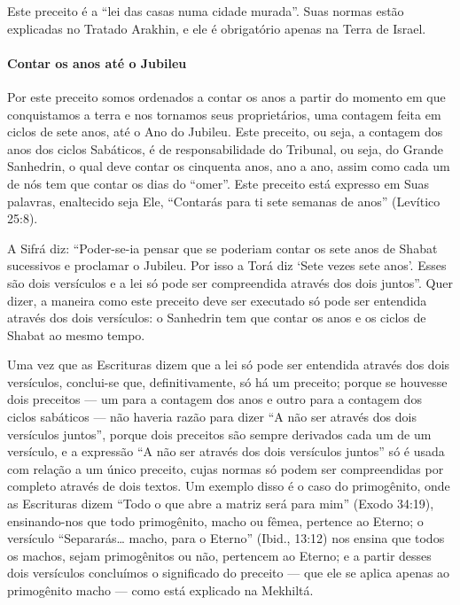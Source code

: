 Este preceito é a ``lei das casas numa cidade murada''. Suas normas
estão explicadas no Tratado Arakhin, e ele é obrigatório apenas na Terra
de Israel.

\paragraph{Contar os anos até o Jubileu}

Por este preceito somos ordenados a contar os anos a partir do momento
em que conquistamos a terra e nos tornamos seus proprietários, uma
contagem feita em ciclos de sete anos, até o Ano do Jubileu. Este
preceito, ou seja, a contagem dos anos dos ciclos Sabáticos, é de
responsabilidade do Tribunal, ou seja, do Grande Sanhedrin, o qual deve
contar os cinquenta anos, ano a ano, assim como cada um de nós tem que
contar os dias do ``omer''. Este preceito está expresso em Suas
palavras, enaltecido seja Ele, ``Contarás para ti sete semanas de anos''
(Levítico 25:8).

A Sifrá diz: ``Poder-se-ia pensar que se poderiam contar os sete anos de
Shabat sucessivos e proclamar o Jubileu. Por isso a Torá diz `Sete
vezes sete anos'. Esses são dois versículos e a lei só pode ser
compreendida através dos dois juntos''. Quer dizer, a maneira como este
preceito deve ser executado só pode ser entendida através dos dois
versículos: o Sanhedrin tem que contar os anos e os ciclos de Shabat ao
mesmo tempo.

Uma vez que as Escrituras dizem que a lei só pode ser entendida através
dos dois versículos, conclui-se que, definitivamente, só há um preceito;
porque se houvesse dois preceitos --- um para a contagem dos anos e
outro para a contagem dos ciclos sabáticos --- não haveria razão para
dizer ``A não ser através dos dois versículos juntos'', porque dois
preceitos são sempre derivados cada um de um versículo, e a expressão
``A não ser através dos dois versículos juntos'' só é usada com relação
a um único preceito, cujas normas só podem
ser compreendidas por completo através de dois textos. Um exemplo disso
é o caso do primogênito, onde as Escrituras dizem ``Todo o que abre a
matriz será para mim'' (Exodo 34:19), ensinando-nos que todo
primogênito, macho ou fêmea, pertence ao Eterno; o versículo
``Separarás\ldots{} macho, para o Eterno'' (Ibid., 13:12) nos ensina que
todos os machos, sejam primogênitos ou não, pertencem ao Eterno; e a
partir desses dois versículos concluímos o significado do preceito ---
que ele se aplica apenas ao primogênito macho --- como está explicado na
Mekhiltá.

